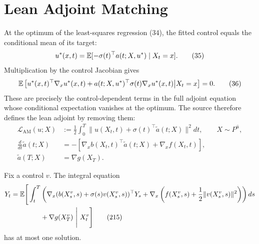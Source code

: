 \section{Lean Adjoint Matching}

At the optimum of the least-squares regression (34), the fitted control equals the conditional mean of its target:
\begin{equation*}
 u^*(x,t)=
 \mathbb{E}[-\sigma(t)^\top a(t;X,u^*)\mid X_t=x].
 \tag{35}
\end{equation*}
Multiplication by the control Jacobian gives
\begin{equation*}
 \mathbb{E}\left[
 u^*(x,t)^\top\nabla_xu^*(x,t)
 +a(t;X,u^*)^\top\sigma(t)\nabla_xu^*(x,t)
 \middle|X_t=x
 \right]=0.
 \tag{36}
\end{equation*}
These are precisely the control-dependent terms in the full adjoint equation whose conditional expectation vanishes at the optimum.  The source therefore defines the lean adjoint by removing them:
\begin{align*}
 \mathcal L_{\mathrm{AM}}(u;X)
 &:=\frac12\int_0^T
 \|u(X_t,t)+\sigma(t)^\top\widetilde a(t;X)\|^2dt,
 \qquad X\sim P^{\bar u},
 \tag{37}\\
 \frac d{dt}\widetilde a(t;X)
 &=-\left[
 \nabla_xb(X_t,t)^\top\widetilde a(t;X)+\nabla_xf(X_t,t)
 \right],
 \tag{38}\\
 \widetilde a(T;X)&=\nabla g(X_T).
 \tag{39}
\end{align*}

\begin{proposition}
Fix a control $v$.  The integral equation
\begin{align*}
 Y_t=\mathbb{E}\Bigg[\int_t^T
 &\left(
 \nabla_x(b(X_s^v,s)+\sigma(s)v(X_s^v,s))^\top Y_s
 +\nabla_x\left(f(X_s^v,s)+\frac12\|v(X_s^v,s)\|^2\right)
 \right)ds\\
 &+\nabla g(X_T^v)
 \ \Bigg|\ X_t^v\Bigg]
 \tag{215}
\end{align*}
has at most one solution.
\end{proposition}

